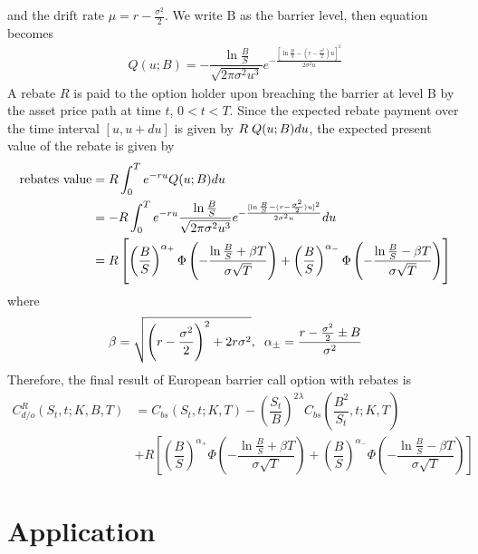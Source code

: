 and the drift rate $\mu=r-\frac{\sigma^2}{2}$. We write B as the barrier level, then equation  becomes
\begin{align*}
	Q(u; B)=-\dfrac{\ln \frac{B}{S}}{\sqrt{2\pi \sigma^2 u^3}}e^{-\frac{[\ln \frac{B}{S}-(r-\frac{\sigma^2}{2})u]^2}{2\sigma^2 u}}
\end{align*}
A rebate $R$ is paid to the option holder upon breaching the barrier
at level B by the asset price path at time $t$, $0 < t < T$. Since the expected rebate
payment over the time interval $[u, u+du]$ is given by $R\hspace{0.1cm}Q(u; B) du$, the expected
present value of the rebate is given by
\begin{align*}
	\textnormal{rebates value}&=R \displaystyle \int_{0}^{T} e^{-ru}Q(u; B)du\\
	&=-R \displaystyle \int_{0}^{T} e^{-ru}\dfrac{\ln \frac{B}{S}}{\sqrt{2\pi \sigma^2 u^3}}e^{-\frac{[\ln \frac{B}{S}-(r-\frac{\sigma^2}{2})u]^2}{2\sigma^2 u}}du\\
	&=R\left[\left(\dfrac{B}{S}\right)^{\alpha_+}\Phi\left(-\dfrac{\ln \frac{B}{S}+\beta T}{\sigma\sqrt{T}}\right)+\left(\dfrac{B}{S}\right)^{\alpha_-}\Phi\left(-\dfrac{\ln \frac{B}{S}-\beta T}{\sigma\sqrt{T}}\right)\right]
\end{align*}
where
\begin{align*}
	\beta=\sqrt{\left(r-\dfrac{\sigma^2}{2}\right)^2+2r\sigma^2}, \hspace{0.2cm} \alpha_\pm = \dfrac{r-\frac{\sigma^2}{2}\pm B}{\sigma^2}
\end{align*}
Therefore, the final result of European barrier call option with rebates is
\begin{align*}
      C^R_{d/o}(S_t,t;K,B,T)&=C_{bs}(S_t,t;K,T)-\left(\dfrac{S_t}{B}\right)^{2\lambda}C_{bs}(\dfrac{B^2}{S_t},t;K,T)\\
       &+R\left[\left(\dfrac{B}{S}\right)^{\alpha_+}\Phi\left(-\dfrac{\ln \frac{B}{S}+\beta T}{\sigma\sqrt{T}}\right)+\left(\dfrac{B}{S}\right)^{\alpha_-}\Phi\left(-\dfrac{\ln \frac{B}{S}-\beta T}{\sigma\sqrt{T}}\right)\right]
\end{align*}
\section{Application}

